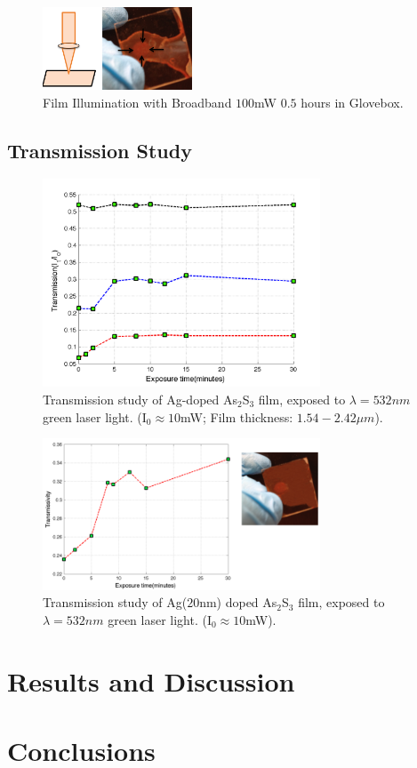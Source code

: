 \documentclass[twocolumn,showpacs,preprintnumbers,amsmath,amssymb]{revtex4}
\begin{document}
\begin{figure}[!h]
  \includegraphics[width=1.75in]{figure/Exposure2.png}
  \caption{Film Illumination with Broadband $100$mW $0.5$ hours in Glovebox.}
  \label{fig:setup}
\end{figure}

\subsection{Transmission Study}
\begin{figure}[!h]
  \includegraphics[width=3.25in]{figure/Transmission.png}
  \caption{Transmission study of Ag-doped As$_2$S$_3$ film, exposed to
    $\lambda = 532nm$ green laser light.
    (I$_0 \approx 10$mW; Film thickness: $1.54-2.42 \mu m$).
}
  \label{fig:setup}
\end{figure}

\begin{figure}[!h]
  \includegraphics[width=3.25in]{figure/Transmission20nm.png}
  \caption{Transmission study of Ag($20$nm) doped As$_2$S$_3$ film, exposed to
    $\lambda = 532nm$ green laser light.
    (I$_0 \approx 10$mW).}
  \label{fig:setup}
\end{figure}


\section{Results and Discussion}
\cite{example}
\section{Conclusions}

\end{document}
